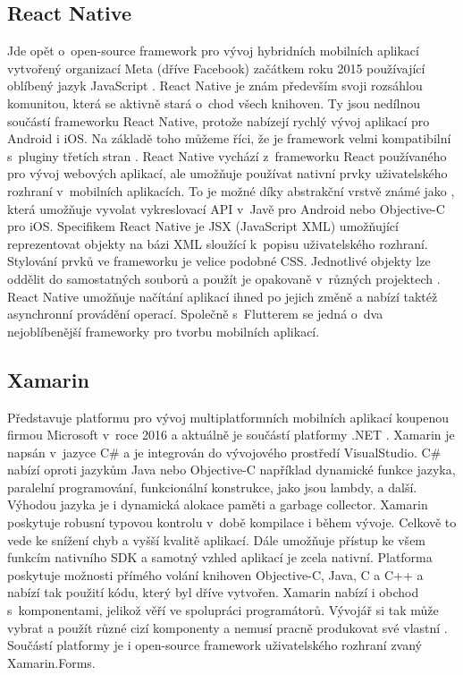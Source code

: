 \subsection*{React Native}
Jde opět o~open-source framework pro vývoj hybridních mobilních aplikací vytvořený organizací Meta (dříve Facebook) začátkem roku 2015 používající oblíbený jazyk JavaScript \cite{reactnative}. React Native je znám především svoji rozsáhlou komunitou, která se aktivně stará o~chod všech knihoven. Ty jsou nedílnou součástí frameworku React Native, protože nabízejí rychlý vývoj aplikací pro Android i iOS. Na základě toho můžeme říci, že je framework velmi kompatibilní s~pluginy třetích stran \cite{flutter2}. React Native vychází z~frameworku React používaného pro vývoj webových aplikací, ale umožňuje používat nativní prvky uživatelského rozhraní v~mobilních aplikacích. To je možné díky abstrakční vrstvě známé jako , která umožňuje vyvolat vykreslovací API v~Javě pro Android nebo Objective-C pro iOS. Specifikem React Native je JSX (JavaScript XML) umožňující reprezentovat objekty na bázi XML sloužící k~popisu uživatelského rozhraní. Stylování prvků ve frameworku je velice podobné CSS. Jednotlivé objekty lze oddělit do samostatných souborů a použít je opakovaně v~různých projektech \cite{reactnative2}. React Native umožňuje načítání aplikací ihned po jejich změně a nabízí taktéž asynchronní provádění operací. Společně s~Flutterem se jedná o~dva nejoblíbenější frameworky pro tvorbu mobilních aplikací. 

\subsection*{Xamarin}
Představuje platformu pro vývoj multiplatformních mobilních aplikací koupenou firmou Microsoft v~roce 2016 a aktuálně je součástí platformy .NET \cite{xamarin}. Xamarin je napsán v~jazyce C\# a je integrován do vývojového prostředí VisualStudio. C\# nabízí oproti jazykům Java nebo Objective-C například dynamické funkce jazyka, paralelní programování, funkcionální konstrukce, jako jsou lambdy, a další. Výhodou jazyka je i dynamická alokace paměti a garbage collector. Xamarin poskytuje robusní typovou kontrolu v~době kompilace i během vývoje. Celkově to vede ke snížení chyb a vyšší kvalitě aplikací. Dále umožňuje přístup ke všem funkcím nativního SDK a samotný vzhled aplikací je zcela nativní. Platforma poskytuje možnosti přímého volání knihoven Objective-C, Java, C a C++ a nabízí tak použití kódu, který byl dříve vytvořen. Xamarin nabízí i obchod s~komponentami, jelikož věří ve spolupráci programátorů. Vývojář si tak může vybrat a použít různé cizí komponenty a nemusí pracně produkovat své vlastní \cite{xamarin2}. Součástí platformy je i open-source framework uživatelského rozhraní zvaný Xamarin.Forms. 
